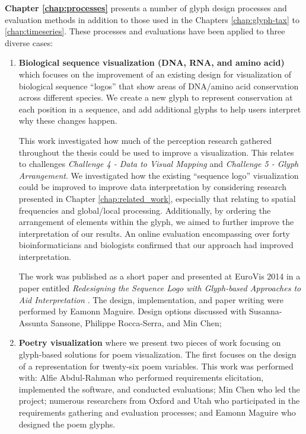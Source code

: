 \textbf{Chapter \ref{chap:processes}} presents a number of glyph design processes and evaluation methods in addition to those used in the Chapters \ref{chap:glyph-tax} to \ref{chap:timeseries}. These processes and evaluations have been applied to three diverse cases: 
\begin{enumerate}

\item \textbf{Biological sequence visualization (DNA, RNA, and amino acid)} which focuses on the improvement of an existing design for visualization of biological sequence ``logos'' that show areas of DNA/amino acid conservation across different species.
We create a new glyph to represent conservation at each position in a sequence, and add additional glyphs to help users interpret why these changes happen.

This work investigated how much of the perception research gathered throughout the thesis could be used to improve a visualization.
This relates to challenges \emph{Challenge 4 - Data to Visual Mapping} and \emph{Challenge 5 - Glyph Arrangement}.
We investigated how the existing ``sequence logo'' visualization could be improved to improve data interpretation by considering research presented in Chapter \ref{chap:related_work}, especially that relating to spatial frequencies and global/local processing.
Additionally, by ordering the arrangement of elements within the glyph, we aimed to further improve the interpretation of our results.
An online evaluation encompassing over forty bioinformaticians and biologists confirmed that our approach had improved interpretation.

The work was published as a short paper and presented at EuroVis 2014 in a paper entitled \emph{Redesigning the Sequence Logo with Glyph-based Approaches to Aid Interpretation} \cite{CGF:maguire14-sp}.
The design, implementation, and paper writing were performed by Eamonn Maguire.
Design options discussed with Susanna-Assunta Sansone, Philippe Rocca-Serra, and Min Chen;

\item \textbf{Poetry visualization} where we present two pieces of work focusing on glyph-based solutions for poem visualization.
The first focuses on the design of a representation for twenty-six poem variables. 
This work was performed with: Alfie Abdul-Rahman who performed requirements elicitation, implemented the software, and conducted evaluations; Min Chen who led the project; numerous researchers from Oxford and Utah who participated in the requirements gathering and evaluation processes; and Eamonn Maguire who designed the poem glyphs.


\end{enumerate}
